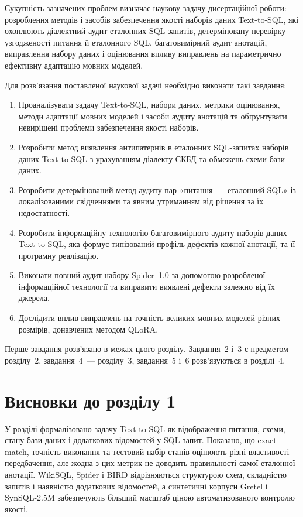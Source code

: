 \documentclass[a4paper,14pt,oneside]{extreport}
\begin{document}
Сукупність зазначених проблем визначає наукову задачу дисертаційної роботи: розроблення методів і засобів забезпечення якості наборів даних Text-to-SQL, які охоплюють діалектний аудит еталонних SQL-запитів, детерміновану перевірку узгодженості питання й еталонного SQL, багатовимірний аудит анотацій, виправлення набору даних і оцінювання впливу виправлень на параметрично ефективну адаптацію мовних моделей.

Для розв'язання поставленої наукової задачі необхідно виконати такі завдання:

\begin{enumerate}
\item Проаналізувати задачу Text-to-SQL, набори даних, метрики оцінювання, методи адаптації мовних моделей і засоби аудиту анотацій та обґрунтувати невирішені проблеми забезпечення якості наборів.

\item Розробити метод виявлення антипатернів в еталонних SQL-запитах наборів даних Text-to-SQL з урахуванням діалекту СКБД та обмежень схеми бази даних.

\item Розробити детермінований метод аудиту пар «питання~--- еталонний SQL» із локалізованими свідченнями та явним утриманням від рішення за їх недостатності.

\item Розробити інформаційну технологію багатовимірного аудиту наборів даних Text-to-SQL, яка формує типізований профіль дефектів кожної анотації, та її програмну реалізацію.

\item Виконати повний аудит набору Spider~1.0 за допомогою розробленої інформаційної технології та виправити виявлені дефекти залежно від їх джерела.

\item Дослідити вплив виправлень на точність великих мовних моделей різних розмірів, донавчених методом QLoRA.
\end{enumerate}

Перше завдання розв'язано в межах цього розділу. Завдання~2 і~3 є предметом розділу~2, завдання~4~--- розділу~3, завдання~5 і~6 розв'язуються в розділі~4.

\section*{Висновки до розділу 1}

У розділі формалізовано задачу Text-to-SQL як відображення питання, схеми, стану бази даних і додаткових відомостей у SQL-запит. Показано, що exact match, точність виконання та тестовий набір станів оцінюють різні властивості передбачення, але жодна з цих метрик не доводить правильності самої еталонної анотації. WikiSQL, Spider і BIRD відрізняються структурою схем, складністю запитів і наявністю додаткових відомостей, а синтетичні корпуси Gretel і SynSQL-2.5M забезпечують більший масштаб ціною автоматизованого контролю якості.
\end{document}
